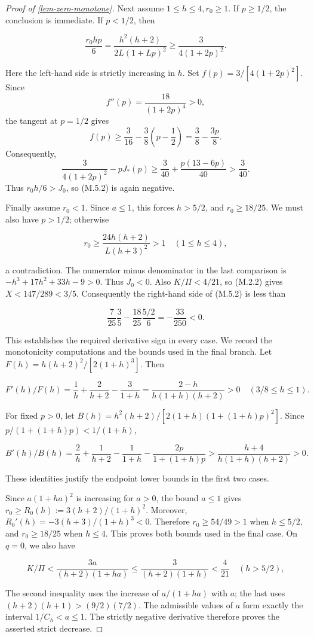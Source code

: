 \documentclass[11pt,a4paper]{article}
\theoremstyle{proofmanuscript}
\begin{document}
\begin{proof}[Proof of \ref{lem-zero-monotone}]
Next assume \(1\le h\le4,r_0\ge1\). If \(p\ge1/2\), the conclusion is immediate. If \(p<1/2\), then

\[
\frac{r_0hp}{6}
=\frac{h^2(h+2)}{2L(1+Lp)^2}
\ge\frac3{4(1+2p)^2}.
\]

Here the left-hand side is strictly increasing in \(h\). Set \(f(p)=3/[4(1+2p)^2]\). Since \[
f''(p)=\frac{18}{(1+2p)^4}>0,
\] the tangent at \(p=1/2\) gives \[
f(p)\ge\frac3{16}-\frac38\left(p-\frac12\right)
=\frac38-\frac{3p}{8}.
\] Consequently, \[
\frac3{4(1+2p)^2}-pJ_*(p)
\ge\frac3{40}+\frac{p(13-6p)}{40}>\frac3{40}.
\] Thus \(r_0h/6>J_0\), so (M.5.2) is again negative.

Finally assume \(r_0<1\). Since \(a\le1\), this forces \(h>5/2\), and \(r_0\ge18/25\). We must also have \(p>1/2\); otherwise

\[
r_0\ge\frac{24h(h+2)}{L(h+3)^2}>1
\quad(1\le h\le4),
\]

a contradiction. The numerator minus denominator in the last comparison is \(-h^3+17h^2+33h-9>0\). Thus \(J_0<0\). Also \(K/\Pi<4/21\), so (M.2.2) gives \(X<147/289<3/5\). Consequently the right-hand side of (M.5.2) is less than

\[
\frac7{25}\frac35-\frac{18}{25}\frac{5/2}{6}
=-\frac{33}{250}<0.
\]

This establishes the required derivative sign in every case. We record the monotonicity computations and the bounds used in the final branch. Let \(F(h)=h(h+2)^2/[2(1+h)^3]\). Then

\[
F'(h)/F(h)=\frac1h+\frac2{h+2}-\frac3{1+h}=\frac{2-h}{h(1+h)(h+2)}>0\quad(3/8\le h\le1).
\]

For fixed \(p>0\), let \(B(h)=h^2(h+2)/[2(1+h)(1+(1+h)p)^2]\). Since \(p/(1+(1+h)p)<1/(1+h)\),

\[
B'(h)/B(h)=\frac2h+\frac1{h+2}-\frac1{1+h}-\frac{2p}{1+(1+h)p}>\frac{h+4}{h(1+h)(h+2)}>0.
\]

These identities justify the endpoint lower bounds in the first two cases.

Since \(a(1+ha)^2\) is increasing for \(a>0\), the bound \(a\le1\) gives \(r_0\ge R_0(h):=3(h+2)/(1+h)^2\). Moreover, \(R_0'(h)=-3(h+3)/(1+h)^3<0\). Therefore \(r_0\ge54/49>1\) when \(h\le5/2\), and \(r_0\ge18/25\) when \(h\le4\). This proves both bounds used in the final case. On \(q=0\), we also have

\[
K/\Pi<\frac{3a}{(h+2)(1+ha)}\le\frac3{(h+2)(1+h)}<\frac4{21}\quad(h>5/2),
\]

The second inequality uses the increase of \(a/(1+ha)\) with \(a\); the last uses \((h+2)(h+1)>(9/2)(7/2)\). The admissible values of \(a\) form exactly the interval \(1/C_h<a\le1\). The strictly negative derivative therefore proves the asserted strict decrease.

\end{proof}
\end{document}
